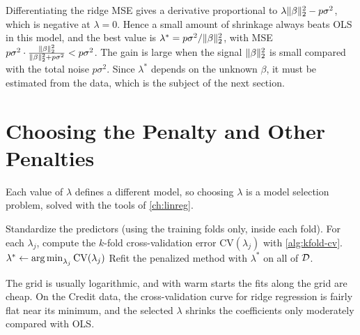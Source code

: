 \begin{remark}\label{rem:ridge-optimal}
Differentiating the ridge MSE gives a derivative proportional to $\lambda\lVert \beta\rVert_2^2-p\sigma^2$, which is negative at $\lambda=0$. Hence a small amount of shrinkage always beats OLS in this model, and the best value is $\lambda^*=p\sigma^2/\lVert \beta\rVert_2^2$, with MSE $p\sigma^2\cdot\frac{\lVert \beta\rVert_2^2}{\lVert \beta\rVert_2^2+p\sigma^2}<p\sigma^2$. The gain is large when the signal $\lVert \beta\rVert_2^2$ is small compared with the total noise $p\sigma^2$. Since $\lambda^*$ depends on the unknown $\beta$, it must be estimated from the data, which is the subject of the next section.
\end{remark}

\section{Choosing the Penalty and Other Penalties}\label{sec:lambda-choice}

Each value of $\lambda$ defines a different model, so choosing $\lambda$ is a model selection problem, solved with the tools of \cref{ch:linreg}.

\begin{algorithm}[H]
\caption{Choosing the Penalty by Cross-Validation}\label{alg:lambda-cv}
\begin{algorithmic}[1]
\State Standardize the predictors (using the training folds only, inside each fold).
\State For each $\lambda_j$, compute the $k$-fold cross-validation error $\mathrm{CV}(\lambda_j)$ with \cref{alg:kfold-cv}.
\State $\lambda^*\gets\operatorname*{arg\,min}_{\lambda_j}\mathrm{CV}(\lambda_j)$
\State Refit the penalized method with $\lambda^*$ on all of $\mathcal{D}$.
\end{algorithmic}
\end{algorithm}

The grid is usually logarithmic, and with warm starts the fits along the grid are cheap. On the Credit data, the cross-validation curve for ridge regression is fairly flat near its minimum, and the selected $\lambda$ shrinks the coefficients only moderately compared with OLS.

